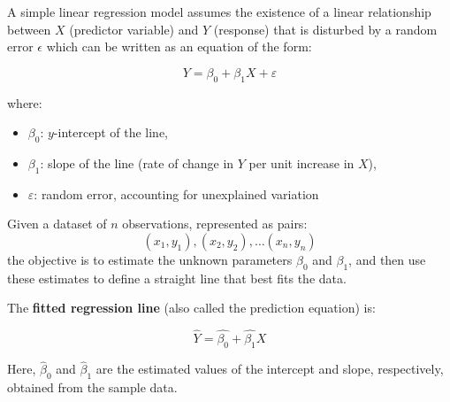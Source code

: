\documentclass[twoside]{book}
\begin{document}
A simple linear regression model assumes the existence of a linear relationship between $X$ (predictor variable) and $Y$ (response) that is disturbed by a random error $\epsilon$ which can be written as an equation of the form:

\begin{textbox}
\[
Y = \beta_0 + \beta_1 X + \varepsilon
\]
\end{textbox}

where:
\begin{itemize}
    \item \( \beta_0 \): $y$-intercept of the line,
    \item \( \beta_1 \): slope of the line (rate of change in \( Y \) per unit increase in \( X \)),
    \item \( \varepsilon \): random error, accounting for unexplained variation
\end{itemize}

Given a dataset of \( n \) observations, represented as pairs:
$$(x_1,y_1), (x_2, y_2), \dots (x_n, y_n)$$
the objective is to estimate the unknown parameters \( \beta_0 \) and \( \beta_1 \), and then use these estimates to define a straight line that best fits the data.

The \textbf{fitted regression line} (also called the prediction equation) is:
\begin{textbox}
    $$\hat{Y} = \hat{\beta_0} + \hat{\beta_1}X$$
\end{textbox}
Here, \( \hat{\beta}_0 \) and \( \hat{\beta}_1 \) are the estimated values of the intercept and slope, respectively, obtained from the sample data.

\begin{center}
\end{center}
\end{document}
